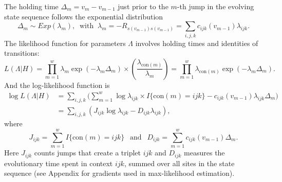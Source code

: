\documentclass[11pt]{article}
\newcommand{\context}[1]{\ensuremath{\mathrm{con}(#1)}}
\begin{document}
The holding time $\Delta_m = v_{m} - v_{m-1}$ just prior to the $m$-th
jump in the evolving state sequence follows the exponential
distribution
\[
\Delta_m \sim \mathit{Exp}(\lambda_m), ~\text{ with }~
\lambda_{m} = -R_{s(v_{m-1})s(v_{m-1})} = \sum_{i,j,k}c_{ijk}(v_{m-1})\lambda_{ijk}.
\]
The likelihood function for parameters $\Lambda$ involves holding times and
identities of transitions:
\begin{equation}\label{eqn:lik}
  L(\Lambda | H) = \prod_{m=1}^{w} \lambda_{m} \exp(-\lambda_{m}\Delta_m)
  \times {\textstyle\left(\frac{\lambda_{\context{m}}}{\lambda_m}\right)}
  =\prod_{m=1}^{w}\lambda_{\context{m}}\exp(-\lambda_m\Delta_m).
\end{equation}
And the log-likelihood function is
\begin{equation}\label{eqn:loglik}
  \begin{array}{ll}
    \log L(\Lambda | H) & = \sum_{i,j,k} \Big(\sum_{m=1}^w\log\lambda_{ijk}\times I{\{\context{m} = ijk\}} - c_{ijk}(v_{m-1})\lambda_{ijk}\Delta_m\Big)\\[1em]
    & = \sum_{i,j,k} \left(J_{ijk}\log\lambda_{ijk} - D_{ijk}\lambda_{ijk} \right),
  \end{array}
\end{equation}
where
\begin{equation}\label{def:JD}
J_{ijk} = \sum_{m=1}^w I\{\context{m} = ijk\}
~~\mbox{ and }~~
D_{ijk} = \sum_{m=1}^w c_{ijk}(v_{m-1})\Delta_m.
\end{equation}
Here $J_{ijk}$ counts jumps that create a triplet $ijk$ and $D_{ijk}$
measures the evolutionary time spent in context $ijk$, summed over all
sites in the state sequence (see Appendix for gradients used in
max-likelihood estimation).

\end{document}
